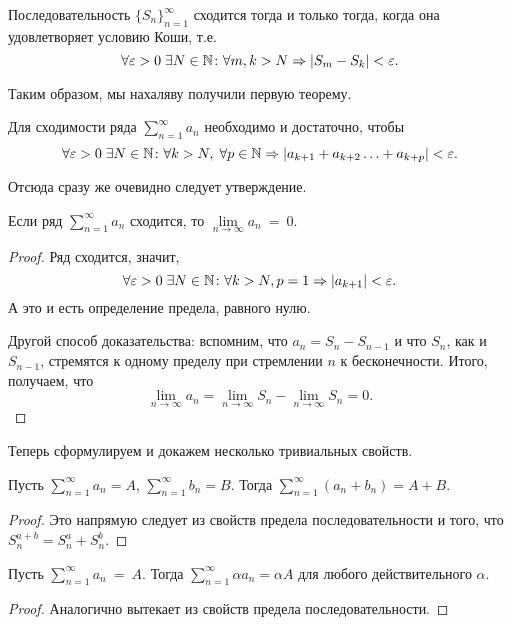 \documentclass[a4paper, 12pt]{article}
\begin{document}
\begin{Examples}
	Последовательность $\{S_n\}_{n=1}^\infty$ сходится тогда и только тогда, когда она удовлетворяет условию Коши, т.е.
	$$
	\forall \varepsilon>0\; \exists N\in \mathbb{N}\colon \forall m,k > N \Rightarrow |S_m - S_k|<\varepsilon.
	$$
\end{Examples}
Таким образом, мы нахаляву получили первую теорему.
\begin{Theorem}
	Для сходимости ряда $\sum\limits_{n=1}^{\infty} a_n$ необходимо и достаточно, чтобы 
	$$
	\forall \varepsilon>0\; \exists N\in \mathbb{N}\colon \forall k>N,\; \forall p\in \mathbb{N} \Rightarrow  |a_{k+1} + a_{k+2} \ldots + a_{k+p}| < \varepsilon.
	$$
	
\end{Theorem}
Отсюда сразу же очевидно следует утверждение.
\begin{Statement}
	Если ряд $\sum\limits_{n=1}^{\infty} a_n$ сходится, то $\lim\limits_{n\to \infty} a_n~=~0$.
\end{Statement}
\begin{proof}
	Ряд сходится, значит,
	$$
	\forall \varepsilon>0\; \exists N \in \mathbb{N}\colon \forall k>N, p = 1 \Rightarrow |a_{k+1}| < \varepsilon.
	$$
	А это и есть определение предела, равного нулю.
	\par Другой способ доказательства: вспомним, что $a_n = S_n - S_{n-1}$ и что $S_n$, как и $S_{n-1}$, стремятся к одному пределу при стремлении $n$ к бесконечности. Итого, получаем, что 
	$$
	\lim\limits_{n \to \infty} a_n = \lim\limits_{n\to \infty} S_n - \lim\limits_{n\to \infty} S_n = 0.
	$$
\end{proof}

Теперь сформулируем и докажем несколько тривиальных свойств.
\begin{Properties}
	Пусть $\sum\limits_{n = 1}^{\infty}a_n = A$, $\sum\limits_{n = 1}^{\infty}b_n = B$. Тогда $\sum\limits_{n = 1}^{\infty}\left(a_n + b_n\right) = A + B$.
\end{Properties}
\begin{proof}
	Это напрямую следует из свойств предела последовательности и того, что $S^{a+b}_n = S_n^a + S_n^b$.
\end{proof}
\begin{Properties}
	Пусть $\sum\limits_{n = 1}^{\infty} a_n~=~A$. Тогда $\sum\limits_{n = 1}^{\infty} \alpha a_n = \alpha A$ для любого действительного $\alpha$.
\end{Properties}
\begin{proof}
	Аналогично вытекает из свойств предела последовательности.
\end{proof}
\end{document}
